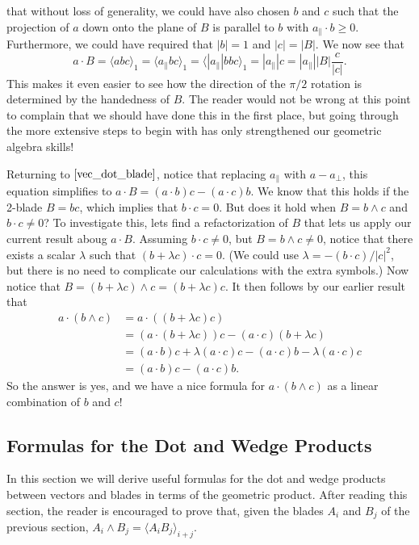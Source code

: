 \documentclass{article}
\newcommand{\prl}{\parallel}
\newcommand{\prp}{\perp}
\begin{document}
that without loss of generality, we could have also chosen $b$ and $c$ such that
the projection of $a$ down onto the plane of $B$ is parallel to $b$ with $a_{\prl}\cdot b\geq 0$.  Furthermore,
we could have required that $|b|=1$ and $|c|=|B|$.  We now see that
\begin{equation}\label{easier_way}
a\cdot B = \langle abc\rangle_1 = \langle a_{\prl}bc\rangle_1 =
\langle |a_{\prl}|bbc\rangle_1 = |a_{\prl}|c = |a_{\prl}||B|\frac{c}{|c|}.
\end{equation}
This makes it even easier to see how the direction of the $\pi/2$ rotation is determined
by the handedness of $B$.  The reader would not be wrong at this point to complain that
we should have done this in the first place, but going through the more extensive steps
to begin with has only strengthened our geometric algebra skills!

Returning to $\eqref{vec_dot_blade}$, notice that replacing $a_{\prl}$ with
$a-a_{\prp}$, this equation simplifies to $a\cdot B=(a\cdot b)c-(a\cdot c)b$.
We know that this holds if the 2-blade $B=bc$, which implies that $b\cdot c=0$.
But does it hold when $B=b\wedge c$ and $b\cdot c\neq 0$?  To investigate this, lets find a refactorization
of $B$ that lets us apply our current result aboug $a\cdot B$.
Assuming $b\cdot c\neq 0$, but $B=b\wedge c\neq 0$, notice that there
exists a scalar $\lambda$ such that $(b+\lambda c)\cdot c=0$.
(We could use $\lambda=-(b\cdot c)/|c|^2$, but there is no need to complicate
our calculations with the extra symbols.)  Now notice that $B=(b+\lambda c)\wedge c = (b+\lambda c)c$.
It then follows by our earlier result that
\begin{align}
a\cdot(b\wedge c) &= a\cdot((b+\lambda c)c)\nonumber \\
 &= (a\cdot(b+\lambda c))c - (a\cdot c)(b+\lambda c)\nonumber \\
 &= (a\cdot b)c + \lambda(a\cdot c)c - (a\cdot c)b - \lambda(a\cdot c)c\nonumber \\
 &= (a\cdot b)c - (a\cdot c)b\label{a_dot_b_wedge_c}.
\end{align}
So the answer is yes, and we have a nice formula for $a\cdot(b\wedge c)$
as a linear combination of $b$ and $c$!

\subsection{Formulas for the Dot and Wedge Products}\label{dot_wedge_gp_formulas}

In this section we will derive useful formulas for the dot and
wedge products between vectors and blades in terms of the geometric
product.  After reading this section, the reader is encouraged to prove that, given the blades
$A_i$ and $B_j$ of the previous section, $A_i\wedge B_j=\langle A_iB_j\rangle_{i+j}$.
\end{document}
